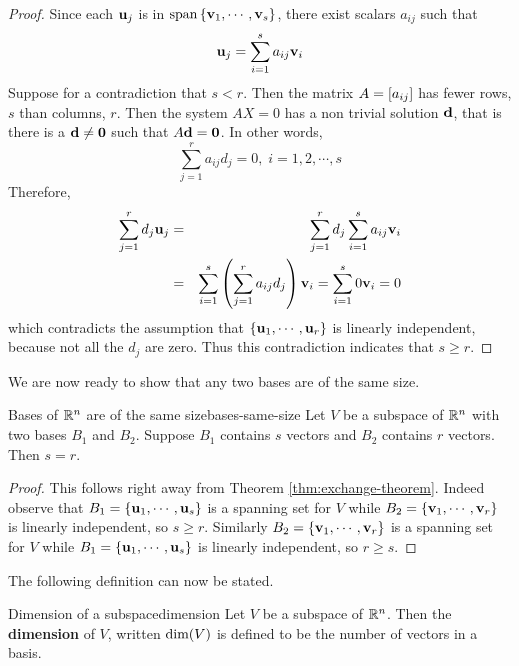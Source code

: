 \begin{proof}
Since each $\mbox{\bf u}_j$ is in $\mbox{\rm span}\left\{\mbox{\bf v}_{1},\cdots ,\mbox{\bf v}_{s}\right\} 
$, there exist scalars $a_{ij}$ such that 
\begin{equation*}
\mbox{\bf u}_{j}=\sum_{i=1}^{s}a_{ij}\mbox{\bf v}_{i}
\end{equation*}
Suppose for a contradiction that $s<r$. Then the matrix $A = \left[
a_{ij} \right]$ has fewer rows, $s$ than columns, $r$. Then the system
$AX=0$ has %
a non trivial solution $\mbox{\bf d}$, that is there is a  $\mbox{\bf d}\neq \mbox{\bf 0}$ such that  $A\mbox{\bf d}=\mbox{\bf 0}$. In other
words, 
\begin{equation*}
\sum_{j=1}^{r}a_{ij}d_{j}=0,\;i=1,2,\cdots ,s
\end{equation*}
Therefore, 
\begin{eqnarray*}
\sum_{j=1}^{r}d_{j}\mbox{\bf u}_{j} &=&\sum_{j=1}^{r}d_{j}\sum_{i=1}^{s}a_{ij}
\mbox{\bf v}_{i} \\
&=&\sum_{i=1}^{s}\left(\sum_{j=1}^{r}a_{ij}d_{j}\right) \mbox{\bf v}
_{i}=\sum_{i=1}^{s}0\mbox{\bf v}_{i}=0
\end{eqnarray*}
which contradicts the assumption that $\left\{\mbox{\bf u}_{1},\cdots ,\mbox{\bf u}_{r}\right\} $
is linearly independent, because not all the $d_{j}$ are zero. Thus this contradiction indicates that $s\geq r$. 
\end{proof}

We are now ready to show that any two bases are of the same size. 

\begin{theorem}{Bases of $\mathbb{R}^{n}$ are of the same size}{bases-same-size}
Let $V$ be a subspace of $\mathbb{R}^{n}$ with two bases $B_1$ and $B_2$. Suppose $B_1$ contains $s$ vectors and $B_2$ contains $r$ vectors. Then $s=r.$
\end{theorem}

\begin{proof}
This follows right away from Theorem \ref{thm:exchange-theorem}. Indeed
observe that $B_1 = \left\{
\mbox{\bf u}_{1},\cdots ,\mbox{\bf u}_{s}\right\} $ is a spanning set for $V$ while $
B_2 = \left\{\mbox{\bf v}_{1},\cdots ,\mbox{\bf v}_{r}\right\} $ is linearly
independent, so $s \geq r.$ Similarly $B_2 = \left\{\mbox{\bf v}_{1},\cdots ,\mbox{\bf v}
_{r}\right\} $ is a spanning set for $V$ while $B_1 = \left\{\mbox{\bf u}_{1},\cdots ,
\mbox{\bf u}_{s}\right\} $ is linearly independent,  so $r\geq s$.
\end{proof}

The following definition can now be stated.

\begin{definition}{Dimension of a subspace}{dimension}
Let $V$ be a subspace of $\mathbb{R}^{n}$. Then the \textbf{dimension }of $V$, written $\mbox{\rm dim}(V)$
is defined to be the number of vectors in a basis.
\end{definition}

